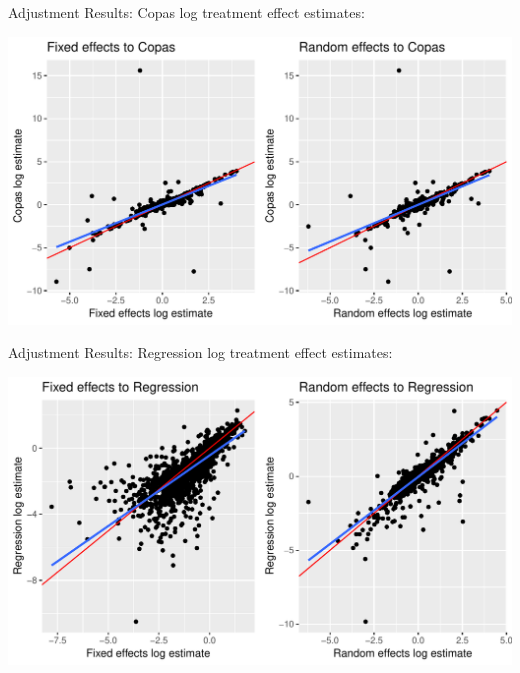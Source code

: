 \documentclass[english]{beamer}\usepackage[]{graphicx}\usepackage[]{color}
\makeatletter
\def\maxwidth{ %
  \ifdim\Gin@nat@width>\linewidth
    \linewidth
  \else
    \Gin@nat@width
  \fi
}
\newenvironment{knitrout}{}{} %
\makeatother
\begin{document}
\begin{frame}[fragile]{Adjustment Results: Copas}
log treatment effect estimates:

\vspace{-3mm}
\begin{knitrout}
\color{fgcolor}
\includegraphics[width=\maxwidth]{figure/unnamed-chunk-22-1} 

\end{knitrout}
\end{frame}


\begin{frame}[fragile]{Adjustment Results: Regression}
log treatment effect estimates:

\vspace{-3mm}
\begin{knitrout}
\color{fgcolor}
\includegraphics[width=\maxwidth]{figure/unnamed-chunk-23-1} 

\end{knitrout}
\end{frame}
\end{document}
